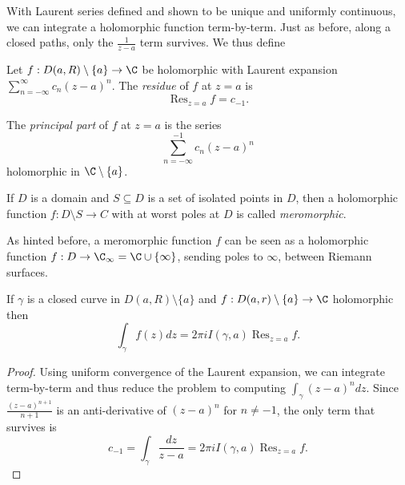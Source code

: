\documentclass[a4paper]{article}
\DeclareMathOperator*{\res}{Res}
\begin{document}
With Laurent series defined and shown to be unique and uniformly continuous, we can integrate a holomorphic function term-by-term. Just as before, along a closed paths, only the \(\frac{1}{z - a}\) term survives. We thus define

\begin{definition}[Residue]
  Let \(f: D(a, R) \setminus \{a\} \to \C\) be holomorphic with Laurent expansion \(\sum_{n = -\infty}^\infty c_n(z - a)^n\). The \emph{residue} of \(f\) at \(z = a\) is
  \[
    \res_{z = a} f = c_{-1}.
  \]
\end{definition}

\begin{definition}
  The \emph{principal part} of \(f\) at \(z = a\) is the series
  \[
    \sum_{n = -\infty}^{-1} c_n(z - a)^n
  \]
  holomorphic in \(\C \setminus \{a\}\).
\end{definition}

\begin{definition}[Meromorphic]
  If \(D\) is a domain and \(S \subseteq D\) is a set of isolated points in \(D\), then a holomorphic function \(f: D \setminus S \to C\) with at worst poles at \(D\) is called \emph{meromorphic}.
\end{definition}

\begin{remark}
  As hinted before, a meromorphic function \(f\) can be seen as a holomorphic function \(f: D \to \C_\infty = \C \cup \{\infty\}\), sending poles to \(\infty\), between Riemann surfaces.
\end{remark}

\begin{proposition}
  If \(\gamma\) is a closed curve in \(D(a, R) \setminus \{a\}\) and \(f: D(a, r) \setminus \{a\} \to \C\) holomorphic then
  \[
    \int_\gamma f(z) dz = 2\pi i I(\gamma, a) \res_{z = a} f.
  \]
\end{proposition}

\begin{proof}
  Using uniform convergence of the Laurent expansion, we can integrate term-by-term and thus reduce the problem to computing \(\int_\gamma (z - a)^n dz\). Since \(\frac{(z - a)^{n + 1}}{n + 1}\) is an anti-derivative of \((z - a)^n\) for \(n \neq -1\), the only term that survives is
  \[
    c_{-1} = \int_\gamma \frac{dz}{z - a} = 2\pi i I(\gamma, a) \res_{z = a} f.
  \]
\end{proof}
\end{document}
